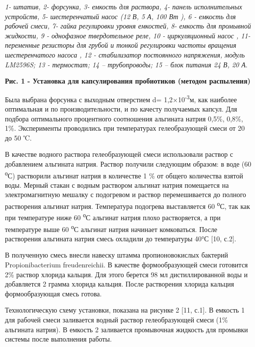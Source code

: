 \emph{1- штатив, 2- форсунка, 3- емкость для раствора, 4- панель
исполнительных устройств, 5- шестеренчатый насос (12 В, 5 А, 100 Вт ), 6
- емкость для рабочей смеси, 7- гайка регулировки уровня емкостей, 8-
емкость для промывной жидкости, 9 - однофазное твердотельное реле, 10 -
циркуляционный насос , 11- переменные резисторы для грубой и тонкой
регулировки частоты вращения шестеренчатого насоса , 12 - стабилизатор
постоянного напряжения, модуль LM2596S; 13 - термостат; 14 --
трубопроводы; 15 -- блок питания 24 В, 20 А}.

{\bfseries Рис. 1 - Установка для капсулирования пробиотиков (методом
распыления)}

Была выбрана форсунка с выходным отверстием d=
1,2×10\textsuperscript{-3}м, как наиболее оптимальная и по
производительности, и по качесту получаемых капсул. Для подбора
оптимального процентного соотношения альгината натрия 0,5\%, 0,8\%, 1\%.
Эксперименты проводились при температурах гелеобразующей смеси от 20 до
50 ℃.

В качестве водного раствора гелеобразующей смеси использовали раствор с
добавлением альгината натрия. Раствор получили следующим образом: в воде
(60 \textsuperscript{о}С) растворили альгинат натрия в количестве 1 \%
от общего количества взятой воды. Мерный стакан с водным раствором
альгинат натрия помещается на электромагнитную мешалку с подогревом и
раствор перемешивается до полного растворения альгинат натрия.
Температура подогрева выставляется 60 \textsuperscript{о}С, так как при
температуре ниже 60 \textsuperscript{о}С альгинат натрия плохо
растворяется, а при температуре выше 60 \textsuperscript{о}С альгинат
натрия начинает комковаться. После растворения альгината натрия смесь
охладили до температуры 40°С {[}10, с.2{]}.

В полученную смесь внесли навеску штамма пропионовокислых бактерий
Propionibacterium freudenreichii. В качестве формообразующей смеси
готовится 2\% раствор хлорида кальция. Для этого берется 98 мл
дистиллированной воды и добавляется 2 грамма хлорида кальция. После
растворения хлорида кальция формообразующая смесь готова.

Технологическую схему установки, показана на рисунке 2 {[}11, с.1{]}. В
емкость 1 для рабочей смеси заливается водный раствор гелеобразующей
смеси (1\% альгината натрия). В емкость 2 заливается промывочная
жидкость для промывки системы после выполнения работы.

